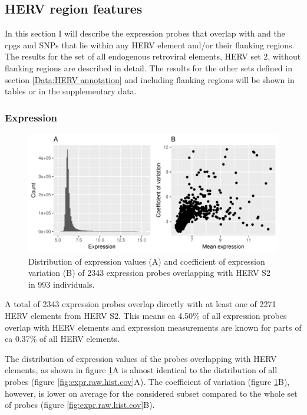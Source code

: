 \documentclass[a4paper,12pt,twoside,openright]{article}
\begin{document}
\subsection{HERV region features}
\label{Results:HERV region features}
In this section I will describe the expression probes that overlap with and the cpgs and SNPs that lie within any HERV element and/or their flanking regions. The results for the set of all endogenous retroviral elements, HERV set 2, without flanking regions are described in detail. The results for the other sets defined in section \ref{Data:HERV annotation} and including flanking regions will be shown in tables or in the supplementary data.

\subsubsection{Expression}
\label{Results:Expression}

\begin{figure}[tb]
	\includegraphics[scale = 1, keepaspectratio = true]{../figures/hervS2_expr_raw_hist_cov}  
	\caption{Distribution of expression values (A) and coefficient of expression variation (B) of 2343 expression probes overlapping with HERV S2 in 993 individuals.}
    \label{fig:hervS2.expr.hist.cov}
\end{figure}

A total of 2343 expression probes overlap directly with at least one of 2271 HERV elements from HERV S2. This means ca 4.50\% of all expression probes overlap with HERV elements and expression measurements are known for parts of ca 0.37\% of all HERV elements.

The distribution of expression values of the probes overlapping with HERV elements, as shown in figure \ref{fig:hervS2.expr.hist.cov}A is almost identical to the distribution of all probes (figure \ref{fig:expr.raw.hist.cov}A). The coefficient of variation (figure \ref{fig:hervS2.expr.hist.cov}B), however, is lower on average for the considered subset compared to the whole set of probes (figure \ref{fig:expr.raw.hist.cov}B).
\end{document}
